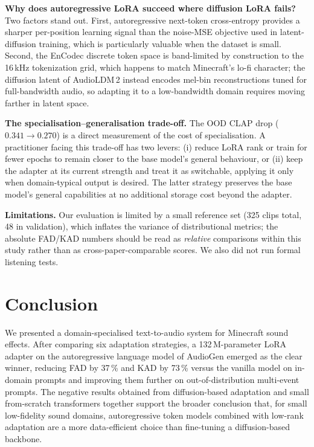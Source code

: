 \documentclass[conference]{IEEEtran}
\begin{document}
\textbf{Why does autoregressive LoRA succeed where diffusion LoRA fails?}
Two factors stand out. First, autoregressive next-token cross-entropy
provides a sharper per-position learning signal than the noise-MSE
objective used in latent-diffusion training, which is particularly
valuable when the dataset is small. Second, the EnCodec discrete token
space is band-limited by construction to the 16\,kHz tokenization grid,
which happens to match Minecraft's lo-fi character; the diffusion latent
of AudioLDM\,2 instead encodes mel-bin reconstructions tuned for
full-bandwidth audio, so adapting it to a low-bandwidth domain requires
moving farther in latent space.

\textbf{The specialisation--generalisation trade-off.}
The OOD CLAP drop ($0.341\to 0.270$) is a direct measurement of the cost
of specialisation. A practitioner facing this trade-off has two
levers: (i) reduce LoRA rank or train for fewer epochs to remain closer
to the base model's general behaviour, or (ii) keep the adapter at its
current strength and treat it as switchable, applying it only when
domain-typical output is desired. The latter strategy preserves the
base model's general capabilities at no additional storage cost beyond
the adapter.

\textbf{Limitations.} Our evaluation is limited by a small reference set
(325 clips total, 48 in validation), which inflates the variance of
distributional metrics; the absolute FAD/KAD numbers should be read as
\emph{relative} comparisons within this study rather than as
cross-paper-comparable scores. We also did not run formal listening tests.

\section{Conclusion}

We presented a domain-specialised text-to-audio system for Minecraft
sound effects. After comparing six adaptation strategies, a
132\,M-parameter LoRA adapter on the autoregressive language model of
AudioGen emerged as the clear winner, reducing FAD by 37\,\% and KAD by
73\,\% versus the vanilla model on in-domain prompts and improving them
further on out-of-distribution multi-event prompts. The negative results
obtained from diffusion-based adaptation and small from-scratch
transformers together support the broader conclusion that, for small
low-fidelity sound domains, autoregressive token models combined with
low-rank adaptation are a more data-efficient choice than fine-tuning a
diffusion-based backbone.



\end{document}
